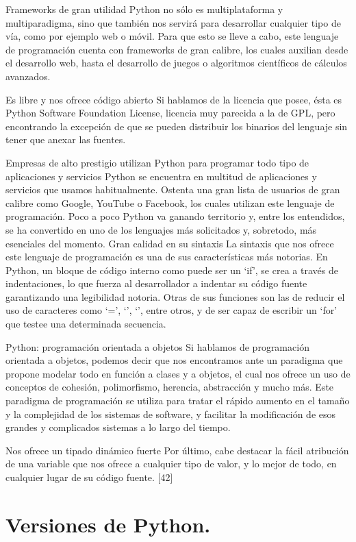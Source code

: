 \documentclass[12pt]{article}
\begin{document}
Frameworks de gran utilidad
Python no sólo es multiplataforma y multiparadigma, sino que también nos servirá para desarrollar cualquier tipo de vía, como por ejemplo web o móvil. Para que esto se lleve a cabo, este lenguaje de programación cuenta con frameworks de gran calibre, los cuales auxilian desde el desarrollo web, hasta el desarrollo de juegos o algoritmos científicos de cálculos avanzados.
 
Es libre y nos ofrece código abierto
Si hablamos de la licencia que posee, ésta es Python Software Foundation License, licencia muy parecida a la de GPL, pero encontrando la excepción de que se pueden distribuir los binarios del lenguaje sin tener que anexar las fuentes.
 
Empresas de alto prestigio utilizan Python para programar todo tipo de aplicaciones y servicios
Python se encuentra en multitud de aplicaciones y servicios que usamos habitualmente. Ostenta una gran lista de usuarios de gran calibre como Google, YouTube o Facebook, los cuales utilizan este lenguaje de programación. Poco a poco Python va ganando territorio y, entre los entendidos, se ha convertido en uno de los lenguajes más solicitados y, sobretodo, más esenciales del momento. 
Gran calidad en su sintaxis
La sintaxis que nos ofrece este lenguaje de programación es una de sus características más notorias. En Python, un bloque de código interno como puede ser un ‘if’, se crea a través de indentaciones, lo que fuerza al desarrollador a indentar su código fuente garantizando una legibilidad notoria.
Otras de sus funciones son las de reducir el uso de caracteres como ‘=’, ‘{’, ‘}’, entre otros, y de ser capaz de escribir un ‘for’ que testee una determinada secuencia.
 
Python: programación orientada a objetos
Si hablamos de programación orientada a objetos, podemos decir que nos encontramos ante un paradigma que propone modelar todo en función a clases y a objetos, el cual nos ofrece un uso de conceptos de cohesión, polimorfismo, herencia, abstracción y mucho más.
Este paradigma de programación se utiliza para tratar el rápido aumento en el tamaño y la complejidad de los sistemas de software, y facilitar la modificación de esos grandes y complicados sistemas a lo largo del tiempo.
 
Nos ofrece un tipado dinámico fuerte
Por último, cabe destacar la fácil atribución de una variable que nos ofrece a cualquier tipo de valor, y lo mejor de todo, en cualquier lugar de su código fuente.
[42]


\section{Versiones de Python.}
\end{document}
